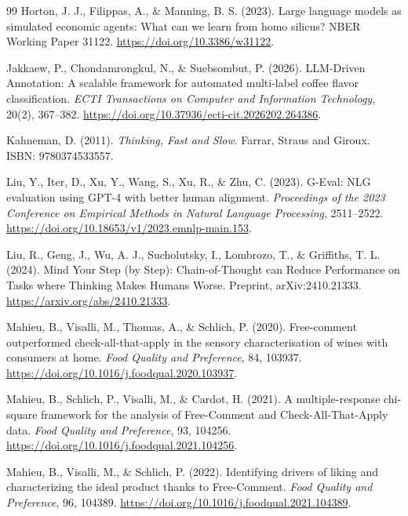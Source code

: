 \documentclass[12pt]{article}
\begin{document}
\begin{thebibliography}{99}
Horton, J. J., Filippas, A., \& Manning, B. S. (2023).
Large language models as simulated economic agents: What can we learn from homo silicus?
NBER Working Paper 31122.
\url{https://doi.org/10.3386/w31122}.

Jakkaew, P., Chondamrongkul, N., \& Suebsombut, P. (2026).
LLM-Driven Annotation: A scalable framework for automated multi-label coffee flavor classification.
\textit{ECTI Transactions on Computer and Information Technology}, 20(2), 367--382.
\url{https://doi.org/10.37936/ecti-cit.2026202.264386}.

Kahneman, D. (2011).
\textit{Thinking, Fast and Slow}.
Farrar, Straus and Giroux.
ISBN: 9780374533557.

Liu, Y., Iter, D., Xu, Y., Wang, S., Xu, R., \& Zhu, C. (2023).
G-Eval: NLG evaluation using GPT-4 with better human alignment.
\textit{Proceedings of the 2023 Conference on Empirical Methods in Natural Language Processing}, 2511--2522.
\url{https://doi.org/10.18653/v1/2023.emnlp-main.153}.

Liu, R., Geng, J., Wu, A. J., Sucholutsky, I., Lombrozo, T., \& Griffiths, T. L. (2024).
Mind Your Step (by Step): Chain-of-Thought can Reduce Performance on Tasks where Thinking Makes Humans Worse.
Preprint, arXiv:2410.21333.
\url{https://arxiv.org/abs/2410.21333}.

Mahieu, B., Visalli, M., Thomas, A., \& Schlich, P. (2020).
Free-comment outperformed check-all-that-apply in the sensory characterisation of wines with consumers at home.
\textit{Food Quality and Preference}, 84, 103937.
\url{https://doi.org/10.1016/j.foodqual.2020.103937}.

Mahieu, B., Schlich, P., Visalli, M., \& Cardot, H. (2021).
A multiple-response chi-square framework for the analysis of Free-Comment and Check-All-That-Apply data.
\textit{Food Quality and Preference}, 93, 104256.
\url{https://doi.org/10.1016/j.foodqual.2021.104256}.

Mahieu, B., Visalli, M., \& Schlich, P. (2022).
Identifying drivers of liking and characterizing the ideal product thanks to Free-Comment.
\textit{Food Quality and Preference}, 96, 104389.
\url{https://doi.org/10.1016/j.foodqual.2021.104389}.


\end{thebibliography}
\end{document}
